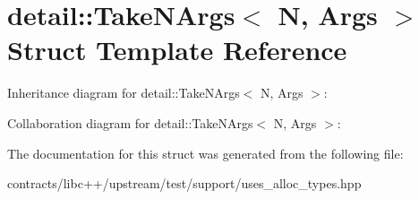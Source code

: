 \hypertarget{structdetail_1_1_take_n_args}{}\section{detail\+:\+:Take\+N\+Args$<$ N, Args $>$ Struct Template Reference}
\label{structdetail_1_1_take_n_args}


Inheritance diagram for detail\+:\+:Take\+N\+Args$<$ N, Args $>$\+:


Collaboration diagram for detail\+:\+:Take\+N\+Args$<$ N, Args $>$\+:


The documentation for this struct was generated from the following file\+:\begin{DoxyCompactItemize}
\item 
contracts/libc++/upstream/test/support/uses\+\_\+alloc\+\_\+types.\+hpp\end{DoxyCompactItemize}
